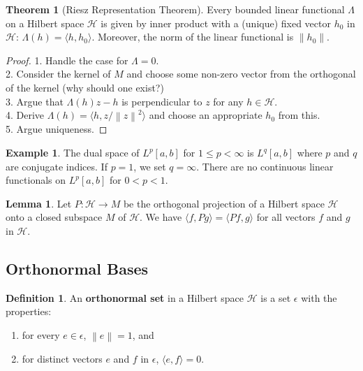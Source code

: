 \documentclass{article}
\theoremstyle{definition}
\newtheorem{theorem}{Theorem}
\newtheorem{example}{Example}
\newtheorem*{defn}{Definition}
\newtheorem{lemma}{Lemma}
\newcommand{\norm}[1]{\left\lVert#1\right\rVert}
\begin{document}
    \begin{theorem}[Riesz Representation Theorem]
        Every bounded linear functional $\Lambda$ on a Hilbert space $\mathcal{H}$ is given by inner product with a (unique) fixed
        vector $h_0$ in $\mathcal{H}$: $\Lambda(h) = \langle h,h_0\rangle$. Moreover, the norm of the linear functional is $\norm{h_0}$.
    \end{theorem}
    \begin{proof}
        1. Handle the case for $\Lambda = 0$.\\
        2. Consider the kernel of $M$ and choose some non-zero vector from the orthogonal of the kernel (why should one exist?)\\
        3. Argue that $\Lambda(h)z - h$ is perpendicular to $z$ for any $h\in\mathcal{H}$.\\
        4. Derive $\Lambda(h) = \langle h,z/\norm{z}^2\rangle$ and choose an appropriate $h_0$ from this.\\
        5. Argue uniqueness.
    \end{proof}

    \begin{example}
        The dual space of $L^p[a,b]$ for $1\leq p<\infty$ is $L^q[a,b]$ where $p$ and $q$ are conjugate indices. If $p=1$, we set
        $q = \infty$. There are no continuous linear functionals on $L^p[a,b]$ for $0 < p < 1$.
    \end{example}

    \begin{lemma}
        Let $P:\mathcal{H}\to M$ be the orthogonal projection of a Hilbert space $\mathcal{H}$ onto a closed subspace $M$ of
        $\mathcal{H}$. We have $\langle f,Pg\rangle = \langle Pf,g\rangle$ for all vectors $f$ and $g$ in $\mathcal{H}$.
    \end{lemma}

    \subsection{Orthonormal Bases}

    \begin{defn}
        An \textbf{orthonormal set} in a Hilbert space $\mathcal{H}$ is a set $\epsilon$ with the properties:
        \begin{enumerate}
            \item for every $e\in\epsilon$, $\norm{e} = 1$, and
            \item for distinct vectors $e$ and $f$ in $\epsilon$, $\langle e,f\rangle = 0$.
        \end{enumerate}
    \end{defn}
\end{document}
